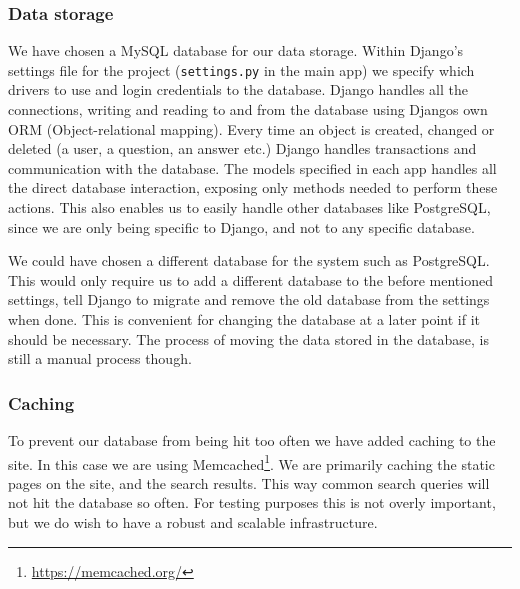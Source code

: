 
\subsubsection*{Data storage}
We have chosen a MySQL database for our data storage. Within Django's settings file for the project (\texttt{settings.py} in the main app) we specify which drivers to use and login credentials to the database. Django handles all the connections, writing and reading to and from the database using Djangos own ORM (Object-relational mapping). Every time an object is created, changed or deleted (a user, a question, an answer etc.) Django handles transactions and communication with the database. The models specified in each app handles all the direct database interaction, exposing only methods needed to perform these actions. This also enables us to easily handle other databases like PostgreSQL, since we are only being specific to Django, and not to any specific database.

We could have chosen a different database for the system such as PostgreSQL. This would only require us to add a different database to the before mentioned settings, tell Django to migrate and remove the old database from the settings when done. This is convenient for changing the database at a later point if it should be necessary. The process of moving the data stored in the database, is still a manual process though.


\subsubsection*{Caching}
To prevent our database from being hit too often we have added caching to the site. In this case we are using Memcached\footnote{\url{https://memcached.org/}}. We are primarily caching the static pages on the site, and the search results. This way common search queries will not hit the database so often. For testing purposes this is not overly important, but we do wish to have a robust and scalable infrastructure.

